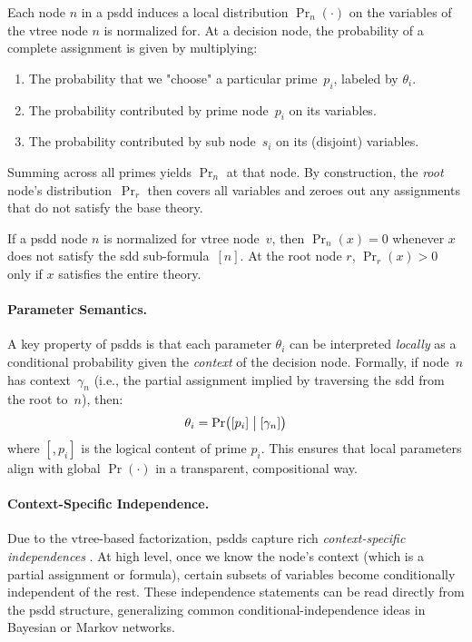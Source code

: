 Each node $n$ in a \acrshort{psdd} induces a local distribution $\Pr_n(\cdot)$ on the variables of the vtree node $n$ is normalized for.  At a decision node, the probability of a complete assignment is given by multiplying:
\begin{enumerate}
\item The probability that we "choose" a particular prime~$p_i$, labeled by $\theta_i$.
\item The probability contributed by prime node~$p_i$ on its variables.
\item The probability contributed by sub node~$s_i$ on its (disjoint) variables.
\end{enumerate}
Summing across all primes yields $\Pr_n$ at that node.  By construction, the \emph{root} node’s distribution~$\Pr_r$ then covers all variables and zeroes out any assignments that do not satisfy the base theory.

\begin{theorem}
\label{thm:psdd-base}
If a \acrshort{psdd} node $n$ is normalized for vtree node~$v$, then $\Pr_n(x)=0$ whenever $x$ does not satisfy the \acrshort{sdd} sub-formula~$[n]$.  At the root node $r$, $\Pr_r(x)>0$ only if $x$ satisfies the entire theory.
\end{theorem}

\paragraph{Parameter Semantics.} A key property of \acrshort{psdd}s is that each parameter $\theta_i$ can be interpreted \emph{locally} as a conditional probability given the \emph{context} of the decision node.  Formally, if node~$n$ has context~$\gamma_n$ (i.e., the partial assignment implied by traversing the \acrshort{sdd} from the root to~$n$), then:
\[
\theta_i =\Pr\bigl([p_i] \bigm|[\gamma_n]\bigr)
\]
where $[,p_i]$ is the logical content of prime $p_i$.  This ensures that local parameters align with global $\Pr(\cdot)$ in a transparent, compositional way.

\paragraph{Context-Specific Independence.} Due to the vtree-based factorization, \acrshort{psdd}s capture rich \emph{context-specific independences} \cite{boutilier_context-specific_2013}.  At high level, once we know the node’s context (which is a partial assignment or formula), certain subsets of variables become conditionally independent of the rest.  These independence statements can be read directly from the \acrshort{psdd} structure, generalizing common conditional-independence ideas in Bayesian or Markov networks.

